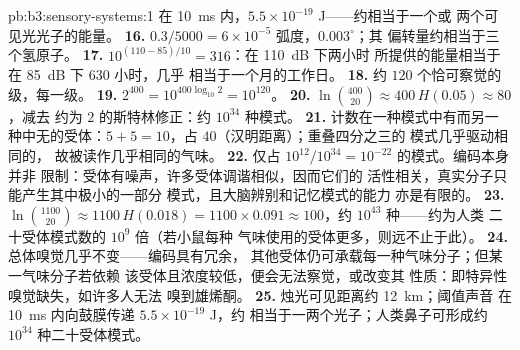 \begin{solution}{pb:b3:sensory-systems:1}
在 \qty{10}{ms} 内，$5.5\times 10^{-19}$ J——约相当于一个或
两个可见光光子的能量。
\textbf{16.} $0.3/5000 = 6\times 10^{-5}$ 弧度，$0.003^{\circ}$；其
偏转量约相当于三个氢原子。
\textbf{17.} $10^{(110 - 85)/10} = 316$：在 \qty{110}{dB} 下两小时
所提供的能量相当于在 \qty{85}{dB} 下 $630$ 小时，几乎
相当于一个月的工作日。
\textbf{18.} 约 $120$ 个恰可察觉的级，每一级。
\textbf{19.} $2^{400} = 10^{400\log_{10}2} = 10^{120}$。
\textbf{20.} $\ln\binom{400}{20} \approx 400\,H(0.05) \approx 80$，减去
约为 $2$ 的斯特林修正：约 $10^{34}$ 种模式。
\textbf{21.} 计数在一种模式中有而另一种中无的受体：$5 +
5 = 10$，占 $40$（汉明距离）；重叠四分之三的
模式几乎驱动相同的，
故被读作几乎相同的气味。
\textbf{22.} 仅占 $10^{12}/10^{34} = 10^{-22}$ 的模式。编码本身并非
限制：受体有噪声，许多受体调谐相似，因而它们的
活性相关，真实分子只能产生其中极小的一部分
模式，且大脑辨别和记忆模式的能力
亦是有限的。
\textbf{23.} $\ln\binom{1100}{20} \approx 1100\,H(0.018) = 1100\times
0.091 \approx 100$，约 $10^{43}$ 种——约为人类
二十受体模式数的 $10^{9}$ 倍（若小鼠每种
气味使用的受体更多，则远不止于此）。
\textbf{24.} 总体嗅觉几乎不变——编码具有冗余，
其他受体仍可承载每一种气味分子；但某一气味分子若依赖
该受体且浓度较低，便会无法察觉，或改变其
性质：即特异性嗅觉缺失，如许多人无法
嗅到雄烯酮。
\textbf{25.} 烛光可见距离约 \qty{12}{km}；阈值声音
在 \qty{10}{ms} 内向鼓膜传递 $5.5\times 10^{-19}$ J，约
相当于一两个光子；人类鼻子可形成约 $10^{34}$ 种二十受体模式。
\end{solution}
